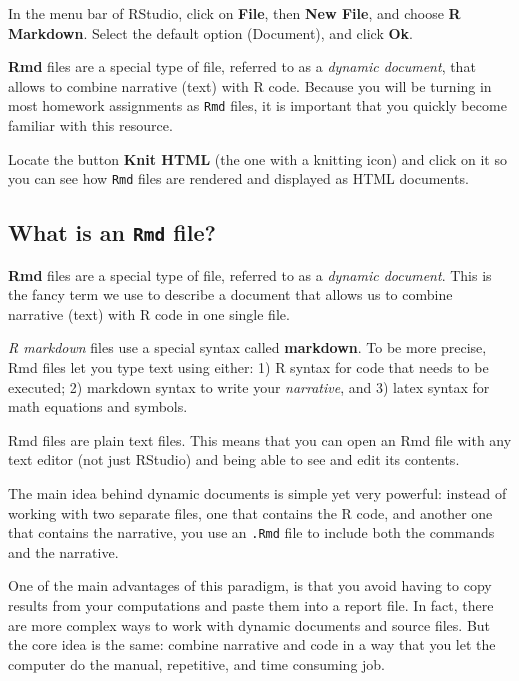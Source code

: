 \documentclass[
]{book}
\begin{document}
In the menu bar of RStudio, click on \textbf{File}, then \textbf{New File},
and choose \textbf{R Markdown}. Select the default option (Document),
and click \textbf{Ok}.

\textbf{Rmd} files are a special type of file, referred to as a \emph{dynamic document},
that allows to combine narrative (text) with R code. Because you will
be turning in most homework assignments as \texttt{Rmd} files, it is important
that you quickly become familiar with this resource.

Locate the button \textbf{Knit HTML} (the one with a knitting icon) and click on it
so you can see how \texttt{Rmd} files are rendered and displayed as HTML documents.

\hypertarget{what-is-an-rmd-file}{%
\subsection{\texorpdfstring{What is an \texttt{Rmd} file?}{What is an Rmd file?}}\label{what-is-an-rmd-file}}

\textbf{Rmd} files are a special type of file, referred to as a \emph{dynamic document}.
This is the fancy term we use to describe a document that allows us to combine
narrative (text) with R code in one single file.

\emph{R markdown} files use a special syntax called \textbf{markdown}. To be more precise,
Rmd files let you type text using either: 1) R syntax for code that needs to be
executed; 2) markdown syntax to write your \emph{narrative}, and 3) latex syntax for
math equations and symbols.

Rmd files are plain text files. This means that you can open an Rmd file
with any text editor (not just RStudio) and being able to see and edit its
contents.

The main idea behind dynamic documents is simple yet very powerful: instead of
working with two separate files, one that contains the R code, and
another one that contains the narrative, you use an \texttt{.Rmd} file to include
both the commands and the narrative.

One of the main advantages of this paradigm,
is that you avoid having to copy results from your computations and paste them
into a report file. In fact, there are more complex ways to work with dynamic
documents and source files. But the core idea is the same: combine narrative
and code in a way that you let the computer do the manual, repetitive,
and time consuming job.
\end{document}
